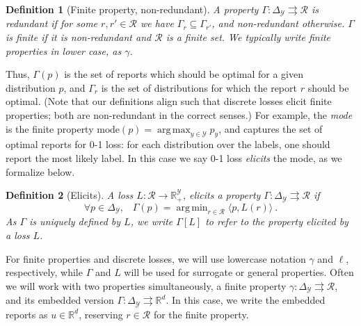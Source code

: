 \documentclass[12pt]{article}
\newcommand{\Comments}{1}
\newcommand{\mytodo}[2]{\ifnum\Comments=1%
  \todo[linecolor=#1!80!black,backgroundcolor=#1,bordercolor=#1!80!black]{#2}\fi}
\newcommand{\raft}[1]{\mytodo{green!20!white}{RF: #1}}
\newcommand{\jessiet}[1]{\mytodo{purple!20!white}{JF: #1}}
\newcommand{\reals}{\mathbb{R}}
\newcommand{\prop}[1]{\Gamma[#1]}
\newcommand{\mode}{\mathrm{mode}}
\newcommand{\simplex}{\Delta_\Y}
\newcommand{\R}{\mathcal{R}}
\newcommand{\Y}{\mathcal{Y}}
\newcommand{\inprod}[2]{\langle #1, #2 \rangle}%
\newcommand{\toto}{\rightrightarrows}
\DeclareMathOperator*{\argmax}{arg\,max}
\DeclareMathOperator*{\argmin}{arg\,min}
\newtheorem{definition}{Definition}
\begin{document}
\begin{definition}[Finite property, non-redundant]
  A property $\Gamma:\simplex\toto\R$ is \emph{redundant} if for some $r,r'\in\R$ we have $\Gamma_r \subseteq \Gamma_{r'}$, and \emph{non-redundant} otherwise.
  $\Gamma$ is \emph{finite} if it is non-redundant and $\R$ is a finite set.
  We typically write finite properties in lower case, as $\gamma$.
\end{definition}

Thus, $\Gamma(p)$ is the set of reports which should be optimal for a given distribution $p$, and $\Gamma_r$ is the set of distributions for which the report $r$ should be optimal.
(Note that our definitions align such that discrete losses elicit finite properties; both are non-redundant in the correct senses.)
For example, the \emph{mode} is the finite property $\mode(p) = \argmax_{y\in\Y} p_y$, and captures the set of optimal reports for 0-1 loss: for each distribution over the labels, one should report the most likely label.
In this case we say 0-1 loss \emph{elicits} the mode, as we formalize below.

\begin{definition}[Elicits]
  A loss $L:\R\to\reals^\Y_+$, \emph{elicits} a property $\Gamma:\simplex \toto \R$ if
  \begin{equation}
    \forall p\in\simplex,\;\;\;\Gamma(p) = \argmin_{r \in \R} \inprod{p}{L(r)}~.
  \end{equation}
  As $\Gamma$ is uniquely defined by $L$, we write $\prop{L}$ to refer to the property elicited by a loss $L$.
\end{definition}

For finite properties and discrete losses, we will use lowercase notation $\gamma$ and $\ell$, respectively, while $\Gamma$ and $L$ will be used for surrogate or general properties.
Often we will work with two properties simultaneously, a finite property $\gamma:\simplex\toto\R$, and its embedded version $\Gamma:\simplex\toto\reals^d$.
In this case, we write the embedded reports as $u\in\reals^d$, reserving $r\in\R$ for the finite property.
\end{document}
